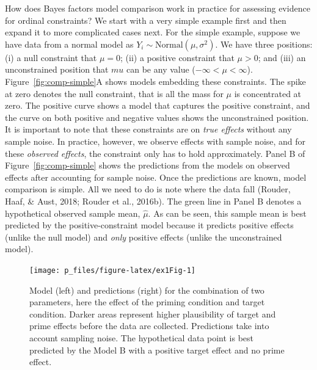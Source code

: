 \documentclass[english,,man]{apa6}
\begin{document}
How does Bayes factors model comparison work in practice for assessing evidence for ordinal constraints? We start with a very simple example first and then expand it to more complicated cases next. For the simple example, suppose we have data from a normal model as \(Y_i \sim \mbox{Normal}(\mu,\sigma^2)\). We have three positions: (i) a null constraint that \(\mu=0\); (ii) a positive constraint that \(\mu>0\); and (iii) an unconstrained position that \(mu\) can be any value (\(-\infty<\mu<\infty\)). Figure~\ref{fig:comp-simple}A shows models embedding these constraints. The spike at zero denotes the null constraint, that is all the mass for \(\mu\) is concentrated at zero. The positive curve shows a model that captures the positive constraint, and the curve on both positive and negative values shows the unconstrained position. It is important to note that these constraints are on \emph{true effects} without any sample noise. In practice, however, we observe effects with sample noise, and for these \emph{observed effects}, the constraint only has to hold approximately. Panel B of Figure~\ref{fig:comp-simple} shows the predictions from the models on observed effects after accounting for sample noise. Once the predictions are known, model comparison is simple. All we need to do is note where the data fall (Rouder, Haaf, \& Aust, 2018; Rouder et al., 2016b). The green line in Panel B denotes a hypothetical observed sample mean, \(\hat{\mu}\). As can be seen, this sample mean is best predicted by the positive-constraint model because it predicts positive effects (unlike the null model) and \emph{only} positive effects (unlike the unconstrained model).

\begin{figure}

{\centering \texttt{[image: p\_files/figure-latex/ex1Fig-1]} 

}

\caption{Model (left) and predictions (right) for the combination of two parameters, here the effect of the priming condition and target condition. Darker areas represent higher plausibility of target and prime effects before the data are collected. Predictions take into account sampling noise. The hypothetical data point is best predicted by the Model B with a positive target effect and no prime effect.}\label{fig:ex1Fig}
\end{figure}
\end{document}
